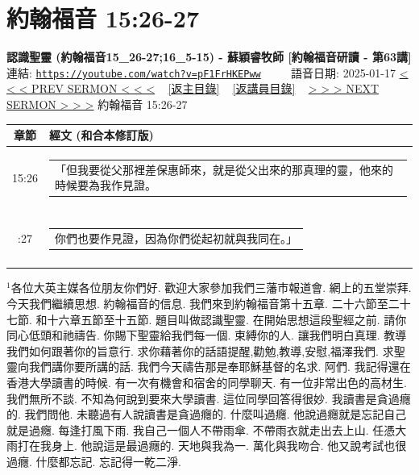 \documentclass{book}
\begin{document}
\section{約翰福音 15:26-27}
\label{sec:pF1FrHKEPww}
\textbf{認識聖靈 (約翰福音15\_26-27;16\_5-15) - 蘇穎睿牧師 [約翰福音研讀 - 第63講]}
\newline
\newline
連結: \href{https://youtube.com/watch?v=pF1FrHKEPww}{\texttt{https://youtube.com/watch?v=pF1FrHKEPww}} ~~~~ 語音日期: 2025-01-17
\newline
\newline
\hyperref[sec:GDV7iT9TooA]{< < < PREV SERMON < < <}
~
\hyperlink{toc}{[返主目錄]}
~
\hyperref[ch:preacher11]{[返講員目錄]}
~
\hyperref[sec:M4alGuubf1o]{> > > NEXT SERMON > > >}
\newline
\newline
約翰福音 15:26-27
\newline
\begin{longtable}{cl}
\hline
\hline
章節 & 經文 (和合本修訂版)\\
\hline
15:26 & \begin{tabularx}{0.7\textwidth}{X} 「但我要從父那裡差保惠師來，就是從父出來的那真理的靈，他來的時候要為我作見證。 \end{tabularx} \\ \\ \relax
15:27 & \begin{tabularx}{0.7\textwidth}{X} 你們也要作見證，因為你們從起初就與我同在。」 \end{tabularx} \\ \\
[1ex]
\hline
\hline
\end{longtable}
$^{1}$各位大英主媒各位朋友你們好.
歡迎大家參加我們三藩市報道會.
網上的五堂崇拜.
今天我們繼續思想.
約翰福音的信息.
我們來到約翰福音第十五章.
二十六節至二十七節.
和十六章五節至十五節.
題目叫做認識聖靈.
在開始思想這段聖經之前.
請你同心低頭和祂禱告.
你賜下聖靈給我們每一個.
束縛你的人.
讓我們明白真理.
教導我們如何跟著你的旨意行.
求你藉著你的話語提醒,勸勉,教導,安慰,福澤我們.
求聖靈向我們講你要所講的話.
我們今天禱告那是奉耶穌基督的名求.
阿們.
我記得還在香港大學讀書的時候.
有一次有機會和宿舍的同學聊天.
有一位非常出色的高材生.
我們無所不談.
不知為何說到要來大學讀書.
這位同學回答得很妙.
我讀書是貪過癮的.
我們問他.
未聽過有人說讀書是貪過癮的.
什麼叫過癮.
他說過癮就是忘記自己就是過癮.
每逢打風下雨.
我自己一個人不帶雨傘.
不帶雨衣就走出去上山.
任憑大雨打在我身上.
他說這是最過癮的.
天地與我為一.
萬化與我吻合.
他又說考試也很過癮.
什麼都忘記.
忘記得一乾二淨.
\end{document}
